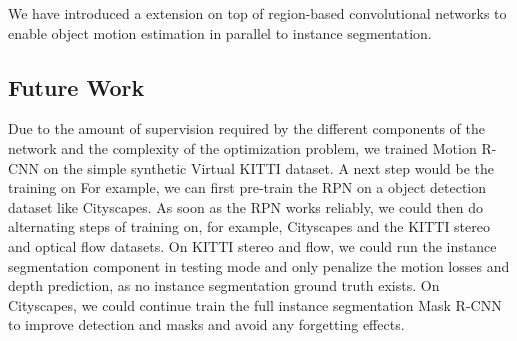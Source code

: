 We have introduced a extension on top of region-based convolutional networks to enable object motion estimation
in parallel to instance segmentation.

\subsection{Future Work}
Due to the amount of supervision required by the different components of the network
and the complexity of the optimization problem,
we trained Motion R-CNN on the simple synthetic Virtual KITTI dataset.
A next step would be the training on
For example, we can first pre-train the RPN on a object detection dataset like
Cityscapes. As soon as the RPN works reliably, we could then do alternating
steps of training on, for example, Cityscapes and the KITTI stereo and optical flow datasets.
On KITTI stereo and flow, we could run the instance segmentation component in testing mode and only penalize
the motion losses and depth prediction, as no instance segmentation ground truth exists. %
On Cityscapes, we could continue train the full instance segmentation Mask R-CNN to
improve detection and masks and avoid any forgetting effects.

